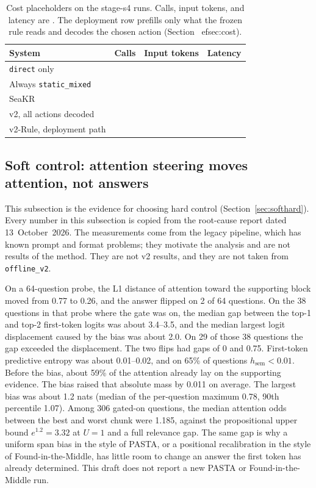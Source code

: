 \begin{table}[t]
\caption{Cost placeholders on the stage-s4 runs.
Calls, input tokens, and latency are \ph{}. The deployment row prefills only what the frozen rule reads and decodes the chosen action (Section~
ef{sec:cost}).}
\label{tab:cost}
\small
\begin{tabular}{@{}lccc@{}}
\toprule
System & Calls & Input tokens & Latency \\
\midrule
\texttt{direct} only & \ph{} & \ph{} & \ph{} \\
Always \texttt{static\_mixed} & \ph{} & \ph{} & \ph{} \\
SeaKR & \ph{} & \ph{} & \ph{} \\
v2, all actions decoded & \ph{} & \ph{} & \ph{} \\
v2-Rule, deployment path & \ph{} & \ph{} & \ph{} \\
\bottomrule
\end{tabular}
\end{table}

\subsection{Soft control: attention steering moves attention, not answers}
\label{sec:steer}
This subsection is the evidence for choosing hard control (Section~\ref{sec:softhard}).
Every number in this subsection is copied from the root-cause report dated 13~October~2026.
The measurements come from the legacy pipeline, which has known prompt and format problems; they motivate the analysis and are not results of the method.
They are not v2 results, and they are not taken from \texttt{offline\_v2}.

On a 64-question probe, the L1 distance of attention toward the supporting block moved from 0.77 to 0.26, and the answer flipped on 2 of 64 questions.
On the 38 questions in that probe where the gate was on, the median gap between the top-1 and top-2 first-token logits was about 3.4--3.5, and the median largest logit displacement caused by the bias was about 2.0.
On 29 of those 38 questions the gap exceeded the displacement.
The two flips had gaps of 0 and 0.75.
First-token predictive entropy was about 0.01--0.02, and on 65\% of questions $h_{\mathrm{sem}}<0.01$.
Before the bias, about 59\% of the attention already lay on the supporting evidence.
The bias raised that absolute mass by 0.011 on average.
The largest bias was about 1.2 nats (median of the per-question maximum 0.78, 90th percentile 1.07).
Among 306 gated-on questions, the median attention odds between the best and worst chunk were 1.185, against the propositional upper bound $e^{1.2}=3.32$ at $U=1$ and a full relevance gap.
The same gap is why a uniform span bias in the style of PASTA, or a positional recalibration in the style of Found-in-the-Middle, has little room to change an answer the first token has already determined.
This draft does not report a new PASTA or Found-in-the-Middle run.

